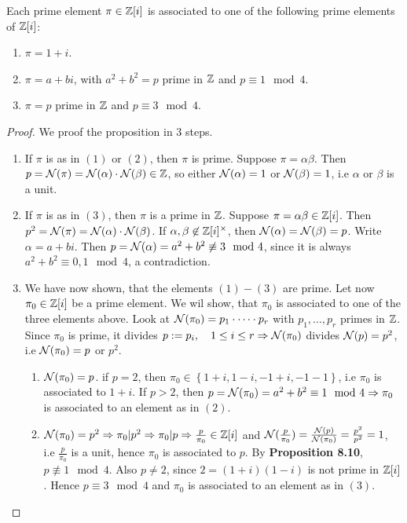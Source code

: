 \begin{Prop}
	Each prime element $\pi \in \mathbb{Z}[i]$ is associated to one of the following prime elements of $\mathbb{Z}[i]$:
	\begin{enumerate}[(1)]
		\item $\pi = 1+i$.
		
		\item $\pi = a+bi$, with $a^2+b^2 = p$ prime in $\mathbb{Z}$ and $p \equiv 1 \mod 4$.
		
		\item $\pi = p$ prime in $\mathbb{Z}$ and $p \equiv3 \mod 4$.
	\end{enumerate}
\end{Prop}
\begin{proof}
	We proof the proposition in 3 steps.
	\begin{enumerate}[Step 1:]
		\item If $\pi$ is as in $(1)$ or $(2)$, then $\pi$ is prime. Suppose $\pi = \alpha\beta$. Then $p = \operatorname{\mathcal{N}}(\pi) = \operatorname{\mathcal{N}}(\alpha) \cdot \operatorname{\mathcal{N}}(\beta) \in \mathbb{Z}$, so either $\operatorname{\mathcal{N}}(\alpha) = 1$ or $\operatorname{\mathcal{N}}(\beta) = 1$, i.e $\alpha$ or $\beta$ is a unit.
		
		\item  If $\pi$ is as in $(3)$, then $\pi$ is a prime in $\mathbb{Z}$. Suppose $\pi = \alpha\beta \in \mathbb{Z}[i]$. Then $p^2 = \operatorname{\mathcal{N}}(\pi) = \operatorname{\mathcal{N}}(\alpha)\cdot\operatorname{\mathcal{N}}(\beta)$. If $\alpha,\beta \not\in \mathbb{Z}[i]^\times$, then $\operatorname{\mathcal{N}}(\alpha) = \operatorname{\mathcal{N}}(\beta) = p$. Write $\alpha = a +bi$. Then $p = \operatorname{\mathcal{N}}(\alpha) = a^2+b^2\not\equiv 3 \mod 4$, since it is always $a^2+b^2 \equiv 0,1 \mod 4$, a contradiction.
		
		\item We have now shown, that the elements $(1)-(3)$ are prime. Let now $\pi_0 \in \mathbb{Z}[i]$ be a prime element. We wil show, that $\pi_0$ is associated to one of the three elements above. Look at $\operatorname{\mathcal{N}}(\pi_0) = p_1 \cdot \dots \cdot p_r$ with $p_1 , \dots,p_r$ primes in $\mathbb{Z}$. Since $\pi_0$ is prime, it divides $p:=p_i, \quad 1 \leq i \leq r \Rightarrow \operatorname{\mathcal{N}}(\pi_0)$ divides $\operatorname{\mathcal{N}}(p) = p^2$, i.e $\operatorname{\mathcal{N}}(\pi_0) = p$ or $p^2$.
		\begin{enumerate}[Case 1:]
			\item $\operatorname{\mathcal{N}}(\pi_0) = p$. if $p = 2$, then $\pi_0 \in \left\lbrace 1+i, 1-i,-1+i,-1-1 \right\rbrace $, i.e $\pi_0$ is associated to $1+i$. If $p > 2$, then $p = \operatorname{\mathcal{N}}(\pi_0) = a^2+b^2 \equiv 1 \mod 4 \Rightarrow \pi_0$ is associated to an element as in $(2)$.
			
			\item $\operatorname{\mathcal{N}}(\pi_0) = p^2 \Rightarrow \pi_0 \vert p^2 \Rightarrow \pi_0 \vert p \Rightarrow \frac{p}{\pi_0} \in \mathbb{Z}[i]$ and $\operatorname{\mathcal{N}}(\frac{p}{\pi_0}) = \frac{\operatorname{\mathcal{N}}(p)}{\operatorname{\mathcal{N}}(\pi_0)} = \frac{p^2}{p^2} = 1$, i.e $\frac{p}{\pi_0}$ is a unit, hence $\pi_0$ is associated to $p$. By \textbf{Proposition 8.10}, $p \not\equiv 1 \mod 4$. Also $p \neq 2$, since $ 2 = (1+i)(1-i)$ is not prime in $\mathbb{Z}[i]$. Hence $p \equiv 3 \mod 4$ and $\pi_0$ is associated to an element as in $(3)$.
		\end{enumerate}		
	\end{enumerate}
\end{proof}

